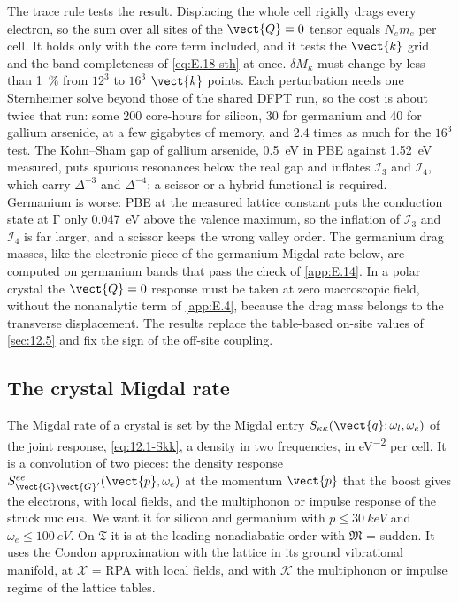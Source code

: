 The trace rule tests the result. Displacing the whole cell rigidly drags every electron, so the sum over all sites of the $\vect{Q} = 0$ tensor equals $N_e m_e$ per cell. It holds only with the core term included, and it tests the $\vect{k}$ grid and the band completeness of \cref{eq:E.18-sth} at once. $\delta M_\kappa$ must change by less than \SI{1}{\percent} from $12^3$ to $16^3$ $\vect{k}$ points. Each perturbation needs one Sternheimer solve beyond those of the shared DFPT run, so the cost is about twice that run: some 200 core-hours for silicon, 30 for germanium and 40 for gallium arsenide, at a few gigabytes of memory, and 2.4 times as much for the $16^3$ test. The Kohn--Sham gap of gallium arsenide, \SI{0.5}{eV} in PBE against \SI{1.52}{eV} measured, puts spurious resonances below the real gap and inflates $\mathcal{I}_3$ and $\mathcal{I}_4$, which carry $\Delta^{-3}$ and $\Delta^{-4}$; a scissor or a hybrid functional is required. Germanium is worse: PBE at the measured lattice constant puts the conduction state at $\mathrm{\Gamma}$ only \SI{0.047}{eV} above the valence maximum, so the inflation of $\mathcal{I}_3$ and $\mathcal{I}_4$ is far larger, and a scissor keeps the wrong valley order. The germanium drag masses, like the electronic piece of the germanium Migdal rate below, are computed on germanium bands that pass the check of \cref{app:E.14}. In a polar crystal the $\vect{Q} = 0$ response must be taken at zero macroscopic field, without the nonanalytic term of \cref{app:E.4}, because the drag mass belongs to the transverse displacement. The results replace the table-based on-site values of \cref{sec:12.5} and fix the sign of the off-site coupling.

\subsection{The crystal Migdal rate}

The Migdal rate of a crystal is set by the Migdal entry $S_{\kappa\kappa}(\vect{q};\omega_l,\omega_e)$ of the joint response, \cref{eq:12.1-Skk}, a density in two frequencies, in \si{eV^{-2}} per cell. It is a convolution of two pieces: the density response $S^{ee}_{\vect{G}\vect{G}'}(\vect{p},\omega_e)$ at the momentum $\vect{p}$ that the boost gives the electrons, with local fields, and the multiphonon or impulse response of the struck nucleus. We want it for silicon and germanium with $p \le \SI{30}{keV}$ and $\omega_e \le \SI{100}{eV}$. On $\mathfrak{T}$ it is at the leading nonadiabatic order with $\mathfrak{M}$ = sudden. It uses the Condon approximation with the lattice in its ground vibrational manifold, at $\mathcal{X}$ = RPA with local fields, and with $\mathcal{K}$ the multiphonon or impulse regime of the lattice tables.

